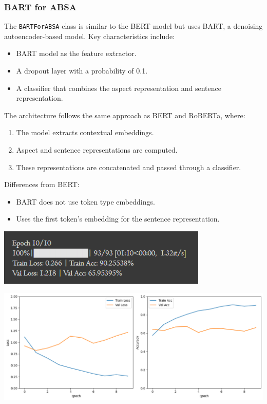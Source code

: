 \documentclass{article}
\begin{document}
\subsubsection{BART for ABSA}
The \texttt{BARTForABSA} class is similar to the BERT model but uses BART, a denoising autoencoder-based model. Key characteristics include:
\begin{itemize}
    \item BART model as the feature extractor.
    \item A dropout layer with a probability of 0.1.
    \item A classifier that combines the aspect representation and sentence representation.
\end{itemize}
The architecture follows the same approach as BERT and RoBERTa, where:
\begin{enumerate}
    \item The model extracts contextual embeddings.
    \item Aspect and sentence representations are computed.
    \item These representations are concatenated and passed through a classifier.
\end{enumerate}

Differences from BERT:
\begin{itemize}
    \item BART does not use token type embeddings.
    \item Uses the first token's embedding for the sentence representation.
\end{itemize}
\begin{center}
\includegraphics[width=0.75\textwidth]{Bart_Accuracy.png}
\end{center}
\begin{center}
\includegraphics[width=1\textwidth]{Bart.png}
\end{center}
\end{document}
